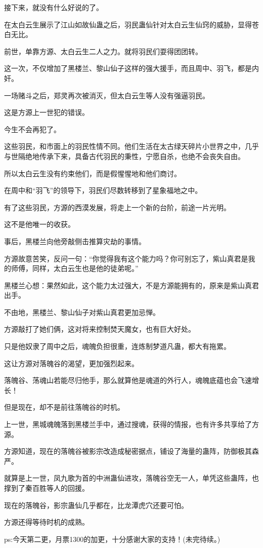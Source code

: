 \begin{this_body}
接下来，就没有什么好说的了。

在太白云生展示了江山如故仙蛊之后，羽民蛊仙针对太白云生仙窍的威胁，显得苍白无比。

前世，单靠方源、太白云生二人之力。就将羽民们耍得团团转。

这一次，不仅增加了黑楼兰、黎山仙子这样的强大援手，而且周中、羽飞，都是内奸。

一场赌斗之后，郑灵再次被消灭，但太白云生等人没有强逼羽民。

这是方源上一世犯的错误。

今生不会再犯了。

这些羽民，和市面上的羽民性情不同。他们生活在太古绿天碎片小世界之中，几乎与世隔绝地传承下来，具备古代羽民的秉性，宁愿自杀，也绝不会丧失自由。

所以太白云生没有约束他们，而是假惺惺地和他们商讨。

在周中和“羽飞”的领导下，羽民们尽数转移到了星象福地之中。

有了这些羽民，方源的西漠发展，将走上一个新的台阶，前途一片光明。

这不是他唯一的收获。

事后，黑楼兰向他旁敲侧击推算灾劫的事情。

方源故意苦笑，反问一句：“你觉得我有这个能力吗？你可别忘了，紫山真君是我的师傅，同样，太白云生也是他的徒弟呢。”

黑楼兰心想：果然如此，这个能力太过强大，不是方源能拥有的，原来是紫山真君出手。

不由地，黑楼兰、黎山仙子对紫山真君更加忌惮。

方源敲打了她们俩，这对将来控制焚天魔女，也有巨大好处。

只是他奴隶了周中之后，魂魄负担很重，连炼制梦道凡蛊，都大有拖累。

这让方源对落魄谷的渴望，更加强烈起来。

落魄谷、荡魂山若能尽归他手，那么就算他是魂道的外行人，魂魄底蕴也会飞速增长！

但是现在，却不是前往落魄谷的时机。

上一世，黑城魂魄落到黑楼兰手中，通过搜魂，获得的情报，也有许多共享给了方源。

方源知道，现在的落魄谷被影宗改造成秘密据点，铺设了海量的蛊阵，防御极其森严。

就算是上一世，凤九歌为首的中洲蛊仙进攻，落魄谷空无一人，单凭这些蛊阵，也撑到了秦百胜等人的回援。

现在的落魄谷，影宗蛊仙几乎都在，比龙潭虎穴还要可怕。

方源还得等待时机的成熟。

ps:今天第二更，月票1300的加更，十分感谢大家的支持！(未完待续。)

\end{this_body}

